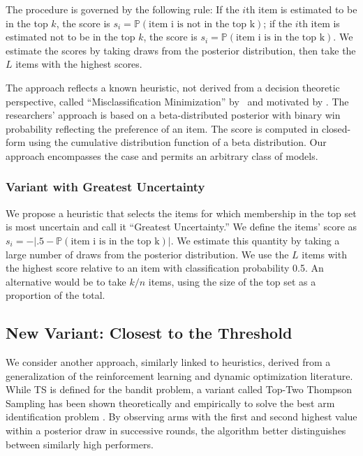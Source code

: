 \documentclass[a4paper,11pt]{article}
\newcommand{\numitems}{n}
\newcommand{\numtopset}{k}
\newcommand{\numperset}{L}
\begin{document}
The procedure is governed by the following rule: If the $i$th item is estimated to be in the top $k$, the score is $s_i=\mathbb{P} (\text{item i is not in the top k})$; if the $i$th item is estimated not to be in the top $k$, the score is $s_i=\mathbb{P} (\text{item i is in the top k})$. We estimate the scores by taking draws from the posterior distribution, then take the $\numperset$ items with the highest scores.

The approach reflects a known heuristic, not derived from a decision theoretic perspective, called ``Misclassification Minimization'' by~\cite{toubia2007adaptive} and motivated by \cite{bradlow1998some}. The researchers' approach is based on a beta-distributed posterior with binary win probability reflecting the preference of an item. The score is computed in closed-form using the cumulative distribution function of a beta distribution. Our approach encompasses the case and permits an arbitrary class of models. 

\subsubsection{Variant with Greatest Uncertainty}

We propose a heuristic that selects the items for which membership in the top set is most uncertain and call it ``Greatest Uncertainty.''  We define the items' score as $s_i=-|.5-\mathbb{P} (\text{item i is in the top k})|$. We estimate this quantity by taking a large number of draws from the posterior distribution. We use the $\numperset$ items with the highest score relative to an item with classification probability 0.5. An alternative would be to take $\numtopset/\numitems$ items, using the size of the top set as a proportion of the total. 

\subsection{New Variant: Closest to the Threshold}

We consider another approach, similarly linked to heuristics, derived from a generalization of the reinforcement learning and dynamic optimization literature. While TS is defined for the bandit problem, a variant called Top-Two Thompson Sampling has been shown theoretically and empirically to solve the best arm identification problem \citep{russo2016simple}. By observing arms with the first and second highest value within a posterior draw in successive rounds, the algorithm better distinguishes between similarly high performers.
\end{document}
